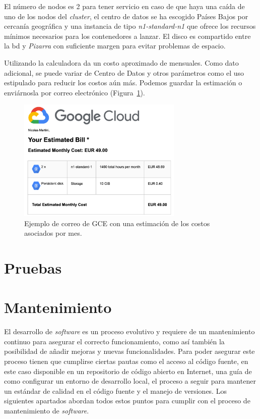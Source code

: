 \documentclass[11pt,spanish,listoffigures,listoftables]{tfgetsinf}
\begin{document}
El número de nodos es 2 para tener servicio en caso de que haya una caída de uno de los nodos del \textit{cluster}, el centro de datos se ha escogido Países Bajos por cercanía geográfica y una instancia de tipo \textit{n1-standard-n1} que ofrece los recursos mínimos necesarios para los contenedores a lanzar. El disco es compartido entre la \acrshort{bd} y \textit{Pizarra} con suficiente margen para evitar problemas de espacio.

Utilizando la calculadora da un costo aproximado de  mensuales. Como dato adicional, se puede variar de Centro de Datos y otros parámetros como el uso estipulado para reducir los costos aún más. Podemos guardar la estimación o enviárnosla por correo electrónico (Figura~\ref{figura:gce-estimated-cost-email}).

\begin{figure}
	\centering
	\includegraphics[width=0.70\textwidth]{img/google-cloud-engine-estimated-cost}
	\caption[Estimación de costos en GCE]{Ejemplo de correo de GCE con una estimación de los costos asociados por mes.}
	\label{figura:gce-estimated-cost-email}
\end{figure}

\chapter{Pruebas}

\chapter{Mantenimiento}

El desarrollo de \textit{software} es un proceso evolutivo y requiere de un mantenimiento continuo para asegurar el correcto funcionamiento, como así también la posibilidad de añadir mejoras y nuevas funcionalidades. Para poder asegurar este proceso tienen que cumplirse ciertas pautas como el acceso al código fuente, en este caso disponible en un repositorio de código abierto en Internet, una guía de como configurar un entorno de desarrollo local, el proceso a seguir para mantener un estándar de calidad en el código fuente y el manejo de versiones. Los siguientes apartados abordan todos estos puntos para cumplir con el proceso de mantenimiento de \textit{software}.
\end{document}
